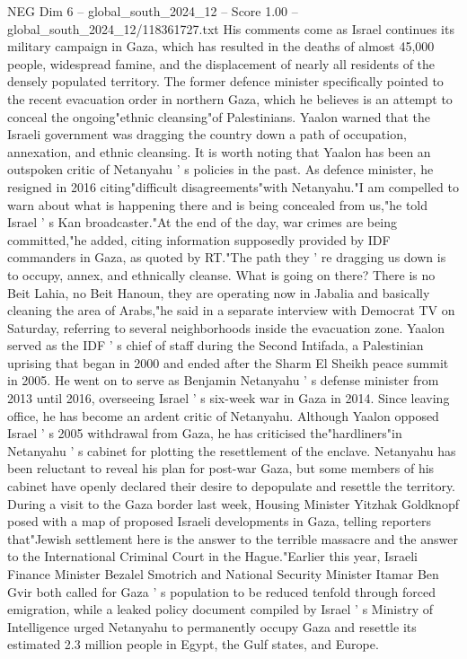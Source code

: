 \begin{textsample}{NEG Dim 6 – global\_south\_2024\_12 – Score 1.00 – global\_south\_2024\_12/118361727.txt}  \label{ex:f6_neg_124}
His comments come as Israel continues its military campaign in Gaza, which has resulted in the deaths of almost 45,000 people, widespread famine, and the displacement of nearly all residents of the densely populated territory.
The former defence minister specifically pointed to the recent evacuation order in northern Gaza, which he believes is an attempt to conceal the ongoing"ethnic cleansing"of Palestinians.
Yaalon warned that the Israeli government was dragging the country down a path of occupation, annexation, and ethnic cleansing.
It is worth noting that Yaalon has been an outspoken critic of Netanyahu ' s policies in the past.
As defence minister, he resigned in 2016 citing"difficult disagreements"with Netanyahu."I am compelled to warn about what is happening there and is being concealed from us,"he told Israel ' s Kan broadcaster."At the end of the day, war crimes are being committed,"he added, citing information supposedly provided by IDF commanders in Gaza, as quoted by RT."The path they ' re dragging us down is to occupy, annex, and ethnically cleanse.
What is going on there?
There is no Beit Lahia, no Beit Hanoun, they are operating now in Jabalia and basically cleaning the area of Arabs,"he said in a separate interview with Democrat TV on Saturday, referring to several neighborhoods inside the evacuation zone.
Yaalon served as the IDF ' s chief of staff during the Second Intifada, a Palestinian uprising that began in 2000 and ended after the Sharm El Sheikh peace summit in 2005.
He went on to serve as Benjamin Netanyahu ' s defense minister from 2013 until 2016, overseeing Israel ' s six-week war in Gaza in 2014.
Since leaving office, he has become an ardent critic of Netanyahu.
Although Yaalon opposed Israel ' s 2005 withdrawal from Gaza, he has criticised the"hardliners"in Netanyahu ' s cabinet for plotting the resettlement of the enclave.
Netanyahu has been reluctant to reveal his plan for post-war Gaza, but some members of his cabinet have openly declared their desire to depopulate and resettle the territory.
During a visit to the Gaza border last week, Housing Minister Yitzhak Goldknopf posed with a map of proposed Israeli developments in Gaza, telling reporters that"Jewish settlement here is the answer to the terrible massacre and the answer to the International Criminal Court in the Hague."Earlier this year, Israeli Finance Minister Bezalel Smotrich and National Security Minister Itamar Ben Gvir both called for Gaza ' s population to be reduced tenfold through forced emigration, while a leaked policy document compiled by Israel ' s Ministry of Intelligence urged Netanyahu to permanently occupy Gaza and resettle its estimated 2.3 million people in Egypt, the Gulf states, and Europe.

\end{textsample}

